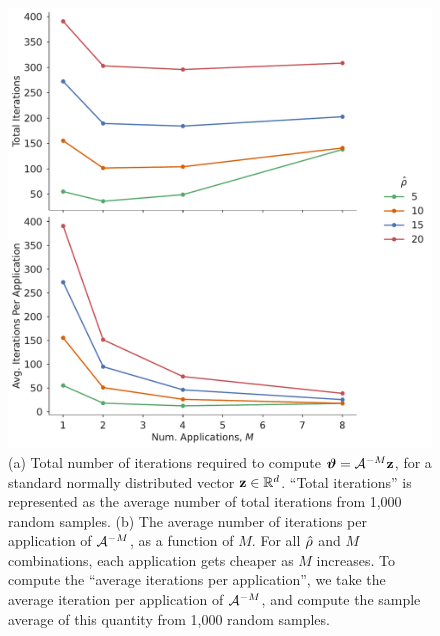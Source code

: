 \begin{figure}
    \centering
    \includegraphics[width=.6\textwidth]{../figures/iterations_vs_applications.pdf}
    \caption{(a) Total number of iterations required to compute
        $\bm{\vartheta} = \mathcal{A}^{-M}\mathbf{z}$, for a standard normally distributed
        vector $\mathbf{z}\in\mathbb{R}^{d}$.
        ``Total iterations'' is represented as the average number of total
        iterations from 1,000 random samples.
        (b) The average number of iterations per application of
        $\mathcal{A}^{-M}$, as a function of $M$.
        For all $\hat{\rho}$ and $M$ combinations, each application gets cheaper as
        $M$ increases.
        To compute the ``average iterations per application'', we take the
        average iteration per application of $\mathcal{A}^{-M}$, and compute the sample
        average of this quantity from 1,000 random samples.
    }
    \label{fig:iters_and_apps}
\end{figure}
